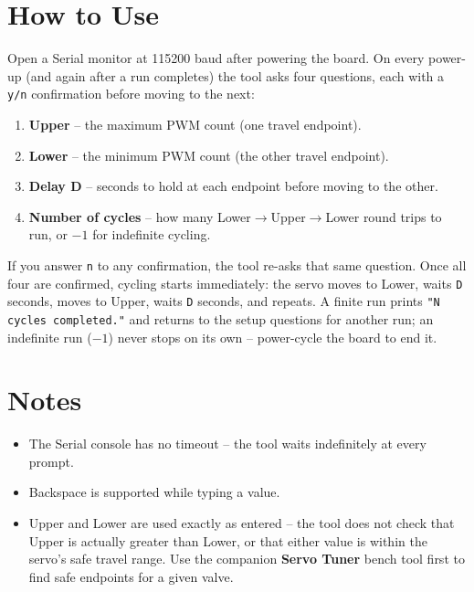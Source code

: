 \documentclass[11pt,letterpaper]{article}
\begin{document}
\section{How to Use}

Open a Serial monitor at 115200 baud after powering the board. On every
power-up (and again after a run completes) the tool asks four questions,
each with a \texttt{y/n} confirmation before moving to the next:

\begin{enumerate}[nosep]
  \item \textbf{Upper} -- the maximum PWM count (one travel endpoint).
  \item \textbf{Lower} -- the minimum PWM count (the other travel endpoint).
  \item \textbf{Delay D} -- seconds to hold at each endpoint before moving
        to the other.
  \item \textbf{Number of cycles} -- how many Lower$\to$Upper$\to$Lower
        round trips to run, or \textbf{$-1$} for indefinite cycling.
\end{enumerate}

If you answer \texttt{n} to any confirmation, the tool re-asks that same
question. Once all four are confirmed, cycling starts immediately: the
servo moves to Lower, waits \texttt{D} seconds, moves to Upper, waits
\texttt{D} seconds, and repeats. A finite run prints \texttt{"N cycles
completed."} and returns to the setup questions for another run; an
indefinite run (\texttt{$-1$}) never stops on its own -- power-cycle the
board to end it.

\section{Notes}

\begin{itemize}[nosep]
  \item The Serial console has no timeout -- the tool waits indefinitely
        at every prompt.
  \item Backspace is supported while typing a value.
  \item Upper and Lower are used exactly as entered -- the tool does not
        check that Upper is actually greater than Lower, or that either
        value is within the servo's safe travel range. Use the companion
        \textbf{Servo Tuner} bench tool first to find safe endpoints for a
        given valve.
\end{itemize}
\end{document}
